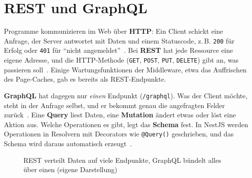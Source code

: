 \section{REST und GraphQL}
\label{sec:rest}
\label{sec:graphql}

Programme kommunizieren im Web über \textbf{HTTP}: Ein Client schickt eine Anfrage, der Server antwortet mit Daten und einem Statuscode, z.\,B. \texttt{200} für Erfolg oder \texttt{401} für \enquote{nicht angemeldet}~\cite{mdn-http}. Bei \textbf{REST} hat jede Ressource eine eigene Adresse, und die HTTP-Methode (\texttt{GET}, \texttt{POST}, \texttt{PUT}, \texttt{DELETE}) gibt an, was passieren soll~\cite{rest-fielding}. Einige Wartungsfunktionen der Middleware, etwa das Auffrischen des Page-Caches, gab es bereits als REST-Endpunkte.

\textbf{GraphQL} hat dagegen nur \emph{einen} Endpunkt (\texttt{/graphql}). Was der Client möchte, steht in der Anfrage selbst, und er bekommt genau die angefragten Felder zurück~\cite{graphql}. Eine \textbf{Query} liest Daten, eine \textbf{Mutation} ändert etwas oder löst eine Aktion aus. Welche Operationen es gibt, legt das \textbf{Schema} fest. In NestJS werden Operationen in Resolvern mit Decorators wie \texttt{@Query()} geschrieben, und das Schema wird daraus automatisch erzeugt~\cite{nestjs-graphql}.

\begin{figure}[htbp]
  \centering
  \caption[REST und GraphQL im Vergleich]{REST verteilt Daten auf viele Endpunkte, GraphQL bündelt alles über einen (eigene Darstellung)}
  \label{fig:rest-graphql}
\end{figure}

